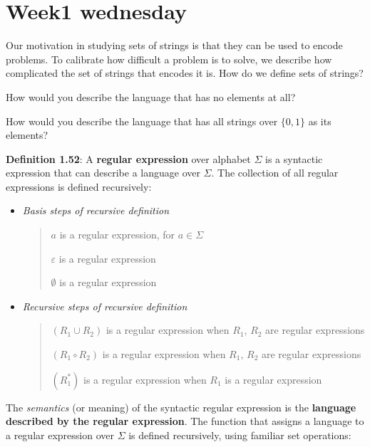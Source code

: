 \documentclass[12pt, oneside]{article}
\begin{document}
\section*{Week1 wednesday}


Our motivation in studying sets of strings is that they can be used to encode problems.
To calibrate how difficult a problem is to solve, we describe how complicated the set of strings that encodes it is. 
How do we define sets of strings?


\vfill

How would you describe the language that has no elements at all?

\vfill

How would you describe the language that has all strings over $\{0,1\}$ as its elements?

\vfill

\newpage


{\bf Definition 1.52}: A {\bf regular expression} over alphabet $\Sigma$
is a syntactic expression that can describe a language over $\Sigma$. The collection of all regular
expressions is defined recursively:
\begin{itemize}
\item[] {\it Basis steps of recursive definition}
\begin{quote}    
    $a$ is a regular expression, for $a \in \Sigma$

    $\varepsilon$ is a regular expression

    $\emptyset$ is a regular expression
\end{quote}

\item[] {\it Recursive steps of recursive definition}
\begin{quote}
    $(R_1 \cup R_2)$ is a regular expression when $R_1$, $R_2$ are regular expressions 

    $(R_1 \circ R_2)$ is a regular expression when $R_1$, $R_2$ are regular expressions

    $(R_1^*)$ is a regular expression when $R_1$ is a regular expression 
\end{quote}
\end{itemize}
 

The {\it semantics} (or meaning) of the syntactic regular expression is the {\bf language
described by the regular expression}. The function that assigns a language to a regular expression
over $\Sigma$ is defined recursively, using familiar set operations:
\end{document}

